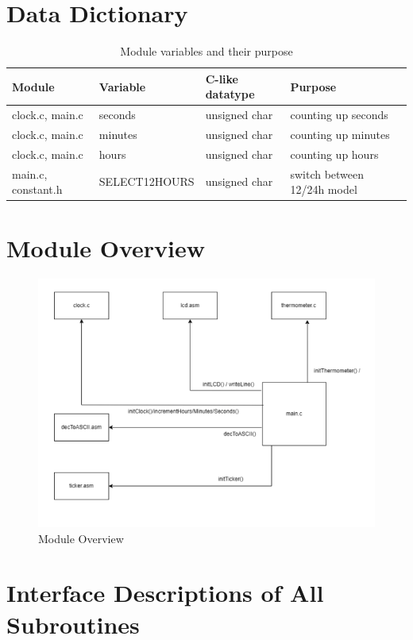 \documentclass[a4paper,12pt]{article}
\begin{document}
\section{Data Dictionary}
\begin{table}[h!]
\centering
\begin{tabular}{|l|l|l|l|}
\hline
\textbf{Module} & \textbf{Variable} & \textbf{C-like datatype} & \textbf{Purpose} \\ \hline
clock.c, main.c & seconds & unsigned char & counting up seconds \\ \hline
clock.c, main.c & minutes & unsigned char & counting up minutes \\ \hline
clock.c, main.c & hours & unsigned char & counting up hours \\ \hline
main.c, constant.h & SELECT12HOURS & unsigned char & switch between 12/24h model \\ \hline
\end{tabular}
\caption{Module variables and their purpose}
\end{table}
\newpage
\section{Module Overview}

\begin{figure}[H]
    \centering
    \includegraphics[width=1\textwidth]{diagrams/moduleOverview.png}
    \caption{Module Overview}
    \label{fig:MainModuleOverview}
\end{figure}

\newpage
\section{Interface Descriptions of All Subroutines}
\end{document}
